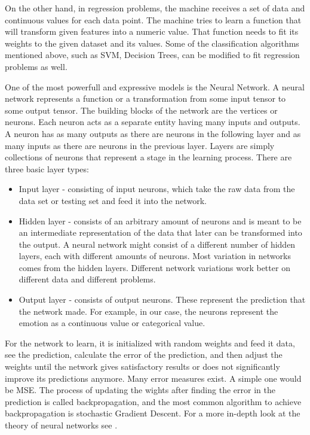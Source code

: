 \documentclass[../main.tex]{subfiles}
\begin{document}
On the other hand, in regression problems, the machine receives a set of data and continuous values for 
each data point. The machine tries to learn a function that will transform given features into a 
numeric value. That function needs to fit its weights to the given dataset and its values. 
Some of the classification algorithms mentioned above, such as SVM, Decision Trees, can be 
modified to fit regression problems as well.

One of the most powerfull and expressive models is the Neural Network. 
A neural network represents a function or a transformation from some input tensor to some output tensor.
The building blocks of the network are the vertices or neurons. Each neuron acts as a separate entity having many inputs and outputs.
A neuron has as many outputs as there are neurons in the following layer and as many inputs as there are neurons in the previous layer.
Layers are simply collections of neurons that represent a stage in the learning process. There are three basic layer types:

 
\begin{itemize}
    \item Input layer - consisting of input neurons, which take the raw data from the data set or testing set and feed it into the network.
    \item Hidden layer - consists of an arbitrary amount of neurons and is meant to be an intermediate representation of the data that
        later can be transformed into the output. A neural network might consist of a different number of hidden layers,
        each with different amounts of neurons. Most variation in networks comes from the hidden layers.
        Different network variations work better on different data and different problems.
    \item Output layer - consists of output neurons. These represent the prediction that the network made.
        For example, in our case, the neurons represent the emotion as a continuous value or categorical value.
\end{itemize}

For the network to learn, it is initialized with random weights and feed it data, see the prediction, calculate the error of the prediction,
and then adjust the weights until the network gives satisfactory results or does not significantly improve its predictions anymore.
Many error measures exist. A simple one would be MSE. The process of updating the wights after finding the error in the prediction
is called backpropagation, and the most common algorithm to achieve backpropagation is stochastic Gradient Descent.
For a more in-depth look at the theory of neural networks see \cite{nnbook1995}.
\par
\end{document}
